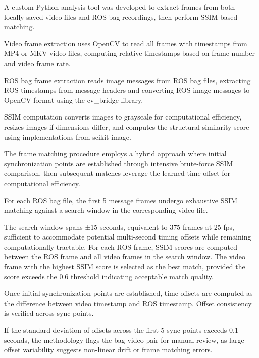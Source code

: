 \documentclass{erauthesis}
\begin{document}

A custom Python analysis tool was developed to extract frames from both locally-saved video files and ROS bag recordings, then perform SSIM-based matching.

Video frame extraction uses OpenCV to read all frames with timestamps from MP4 or MKV video files, computing relative timestamps based on frame number and video frame rate.

ROS bag frame extraction reads image messages from ROS bag files, extracting ROS timestamps from message headers and converting ROS image messages to OpenCV format using the cv\_bridge library.

SSIM computation converts images to grayscale for computational efficiency, resizes images if dimensions differ, and computes the structural similarity score using implementations from scikit-image.


The frame matching procedure employs a hybrid approach where initial synchronization points are established through intensive brute-force SSIM comparison, then subsequent matches leverage the learned time offset for computational efficiency.


For each ROS bag file, the first 5 message frames undergo exhaustive SSIM matching against a search window in the corresponding video file.

The search window spans ±15 seconds, equivalent to 375 frames at 25 fps, sufficient to accommodate potential multi-second timing offsets while remaining computationally tractable.
For each ROS frame, SSIM scores are computed between the ROS frame and all video frames in the search window.
The video frame with the highest SSIM score is selected as the best match, provided the score exceeds the 0.6 threshold indicating acceptable match quality.


Once initial synchronization points are established, time offsets are computed as the difference between video timestamp and ROS timestamp.
Offset consistency is verified across sync points.

If the standard deviation of offsets across the first 5 sync points exceeds 0.1 seconds, the methodology flags the bag-video pair for manual review, as large offset variability suggests non-linear drift or frame matching errors.
\end{document}
